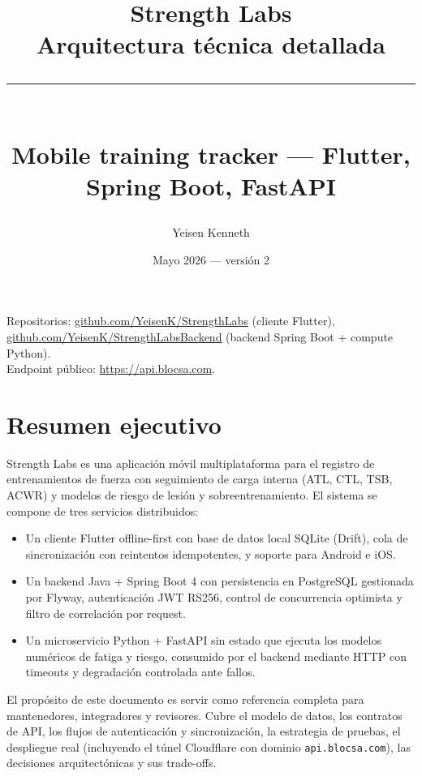 \documentclass[11pt,a4paper]{article}
\title{
  \vspace*{1.2cm}
  {\Huge\bfseries Strength Labs}\\[0.6cm]
  {\Large Arquitectura técnica detallada}\\[0.4cm]
  \rule{0.6\linewidth}{0.4pt}\\[0.4cm]
  {\large Mobile training tracker — Flutter, Spring Boot, FastAPI}
}
\author{Yeisen Kenneth}
\date{Mayo 2026 — versión 2}
\begin{document}
\maketitle
\thispagestyle{empty}
\vfill
\begin{center}
\small
Repositorios: \url{github.com/YeisenK/StrengthLabs} (cliente Flutter),
\url{github.com/YeisenK/StrengthLabsBackend} (backend Spring Boot + compute Python).\\
Endpoint público: \url{https://api.blocsa.com}.
\end{center}
\clearpage

\tableofcontents
\listoffigures
\listoftables
\clearpage

\section{Resumen ejecutivo}

Strength Labs es una aplicación móvil multiplataforma para el registro de entrenamientos de fuerza con seguimiento de carga interna (ATL, CTL, TSB, ACWR) y modelos de riesgo de lesión y sobreentrenamiento. El sistema se compone de tres servicios distribuidos:

\begin{itemize}[leftmargin=*]
  \item Un cliente Flutter offline-first con base de datos local SQLite (Drift), cola de sincronización con reintentos idempotentes, y soporte para Android e iOS.
  \item Un backend Java + Spring Boot 4 con persistencia en PostgreSQL gestionada por Flyway, autenticación JWT RS256, control de concurrencia optimista y filtro de correlación por request.
  \item Un microservicio Python + FastAPI sin estado que ejecuta los modelos numéricos de fatiga y riesgo, consumido por el backend mediante HTTP con timeouts y degradación controlada ante fallos.
\end{itemize}

El propósito de este documento es servir como referencia completa para mantenedores, integradores y revisores. Cubre el modelo de datos, los contratos de API, los flujos de autenticación y sincronización, la estrategia de pruebas, el despliegue real (incluyendo el túnel Cloudflare con dominio \texttt{api.blocsa.com}), las decisiones arquitectónicas y sus trade-offs.
\end{document}
